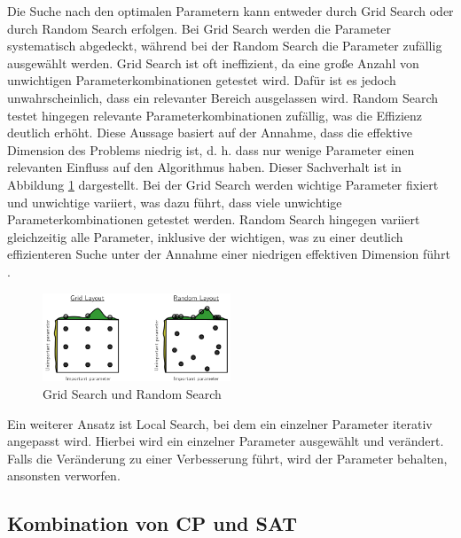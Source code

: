 Die Suche nach den optimalen Parametern kann entweder durch Grid Search oder
durch Random Search erfolgen. Bei Grid Search werden die Parameter systematisch
abgedeckt, während bei der Random Search die Parameter zufällig ausgewählt
werden. Grid Search ist oft ineffizient, da eine große Anzahl von unwichtigen
Parameterkombinationen getestet wird. Dafür ist es jedoch unwahrscheinlich, dass
ein relevanter Bereich ausgelassen wird. Random Search testet hingegen relevante
Parameterkombinationen zufällig, was die Effizienz deutlich erhöht. Diese
Aussage basiert auf der Annahme, dass die effektive Dimension des Problems
niedrig ist, d. h. dass nur wenige Parameter einen relevanten Einfluss auf den
Algorithmus haben. Dieser Sachverhalt ist in Abbildung
\ref{fig:GridRandomSearch} dargestellt. Bei der Grid Search werden wichtige
Parameter fixiert und unwichtige variiert, was dazu führt, dass viele unwichtige
Parameterkombinationen getestet werden. Random Search hingegen variiert
gleichzeitig alle Parameter, inklusive der wichtigen, was zu einer deutlich
effizienteren Suche unter der Annahme einer niedrigen effektiven Dimension führt
\cite[284]{bergsjo}.

\begin{figure}[h]
    \centering
    \includegraphics[width=0.5\textwidth]{figures/Grid Search vs. Random Search [kotth23pr].PNG}
    \caption{Grid Search und Random Search \cite[284]{bergsjo}}
    \label{fig:GridRandomSearch}
\end{figure}

Ein weiterer Ansatz ist Local Search, bei dem ein einzelner Parameter iterativ
angepasst wird. Hierbei wird ein einzelner Parameter ausgewählt und verändert.
Falls die Veränderung zu einer Verbesserung führt, wird der Parameter behalten,
ansonsten verworfen.


  
\subsection{Kombination von CP und SAT}
\label{sec:Kombination-von-CP-und-SAT}

